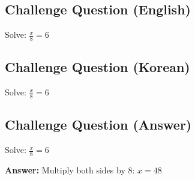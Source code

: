 \cleardoublepage
\subsection*{Challenge Question (English)}
Solve: $\frac{x}{8} = 6$


\newpage
\subsection*{Challenge Question (Korean)}
Solve: $\frac{x}{8} = 6$


\newpage
\subsection*{Challenge Question (Answer)}
Solve: $\frac{x}{8} = 6$

\textbf{Answer:} Multiply both sides by 8: $x = 48$
